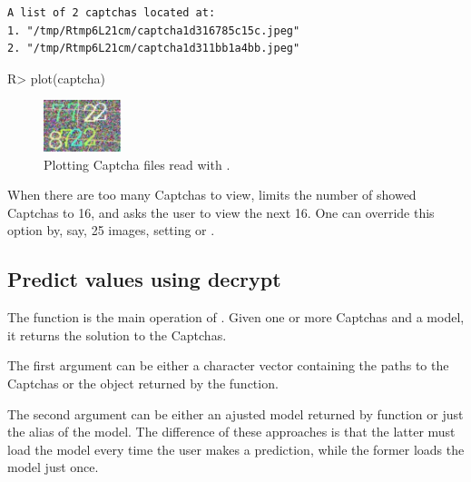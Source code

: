 \documentclass[article,nojss]{jss}
\begin{document}
\begin{verbatim}
A list of 2 captchas located at:
1. "/tmp/Rtmp6L21cm/captcha1d316785c15c.jpeg"
2. "/tmp/Rtmp6L21cm/captcha1d311bb1a4bb.jpeg"
\end{verbatim}

\begin{CodeChunk}

\begin{CodeInput}
R> plot(captcha)
\end{CodeInput}
\end{CodeChunk}

\begin{CodeChunk}
\begin{figure}[H]

{\centering \includegraphics[width=0.2\textwidth]{decryptr_jss_files/figure-latex/two-img-1} 

}

\caption[Plotting Captcha files read with ]{Plotting Captcha files read with .}\label{fig:two-img}
\end{figure}
\end{CodeChunk}

When there are too many Captchas to view,  limits the
number of showed Captchas to 16, and asks the user to view the next 16.
One can override this option by, say, 25 images, setting
 or .

\hypertarget{predict-values-using-decrypt}{%
\subsection{Predict values using
decrypt}\label{predict-values-using-decrypt}}

The  function is the main operation of .
Given one or more Captchas and a model, it returns the solution to the
Captchas.

The first argument can be either a character vector containing the paths
to the Captchas or the object returned by the 
function.

The second argument can be either an ajusted  model returned
by  function or just the alias of the model. The
difference of these approaches is that the latter must load the model
every time the user makes a prediction, while the former loads the model
just once.
\end{document}
